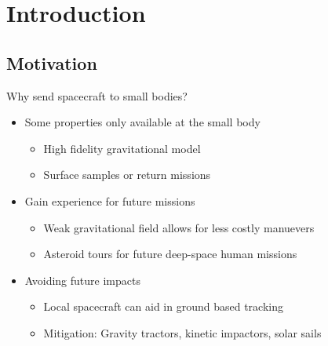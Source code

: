 
\section{Introduction}

\subsection{Motivation}
\begin{frame}[t]{Why send spacecraft to small bodies?}
    \begin{itemize}
        \item<1-> Some properties only available at the small body
            \begin{itemize}
                \item High fidelity gravitational model
                \item Surface samples or return missions
            \end{itemize}
        \item<2-> Gain experience for future missions
            \begin{itemize}
                \item Weak gravitational field allows for less costly manuevers
                \item Asteroid tours for future deep-space human missions
            \end{itemize}
        \item<3-> Avoiding future impacts
            \begin{itemize}
                \item Local spacecraft can aid in ground based tracking
                \item Mitigation: Gravity tractors, kinetic impactors, solar sails
            \end{itemize}
    \end{itemize}

\end{frame}

